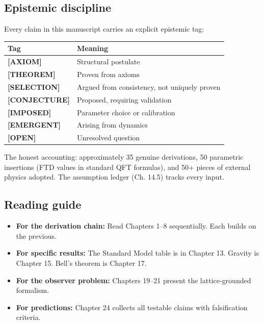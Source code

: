 \documentclass[
  11pt,
  letterpaper,
  twoside,
  openright]{book}
\providecommand{\tightlist}{%
  \setlength{\itemsep}{0pt}\setlength{\parskip}{0pt}}
\begin{document}
\subsection*{Epistemic discipline}\label{epistemic-discipline}

Every claim in this manuscript carries an explicit epistemic tag:

\begin{longtable}[]{@{}ll@{}}
\toprule\noalign{}
Tag & Meaning \\
\midrule\noalign{}
\endhead
\bottomrule\noalign{}
\endlastfoot
\textbf{{[}AXIOM{]}} & Structural postulate \\
\textbf{{[}THEOREM{]}} & Proven from axioms \\
\textbf{{[}SELECTION{]}} & Argued from consistency, not uniquely
proven \\
\textbf{{[}CONJECTURE{]}} & Proposed, requiring validation \\
\textbf{{[}IMPOSED{]}} & Parameter choice or calibration \\
\textbf{{[}EMERGENT{]}} & Arising from dynamics \\
\textbf{{[}OPEN{]}} & Unresolved question \\
\end{longtable}

The honest accounting: approximately 35 genuine derivations, 50
parametric insertions (FTD values in standard QFT formulas), and 50+
pieces of external physics adopted. The assumption ledger (Ch. 14.5)
tracks every input.

\subsection*{Reading guide}\label{reading-guide}

\begin{itemize}
\tightlist
\item
  \textbf{For the derivation chain:} Read Chapters 1--8 sequentially.
  Each builds on the previous.
\item
  \textbf{For specific results:} The Standard Model table is in Chapter
  13. Gravity is Chapter 15. Bell's theorem is Chapter 17.
\item
  \textbf{For the observer problem:} Chapters 19--21 present the
  lattice-grounded formalism.
\item
  \textbf{For predictions:} Chapter 24 collects all testable claims with
  falsification criteria.
\end{itemize}
\end{document}
